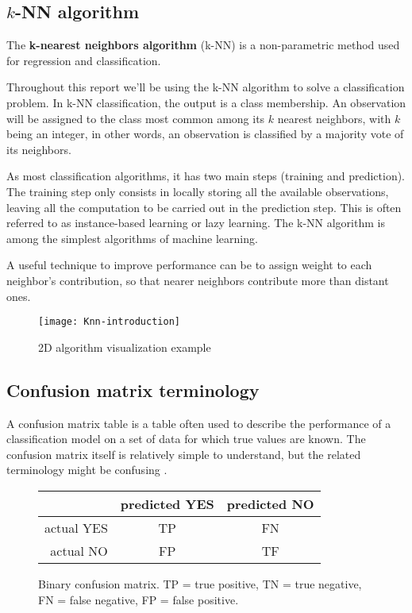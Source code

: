 \subsection{$k$-NN algorithm}

The \textbf{k-nearest neighbors algorithm} (k-NN) is a non-parametric method used for regression and classification. 

Throughout this report we'll be using the k-NN algorithm to solve a classification problem. In k-NN classification, the output is a class membership. An observation will be assigned to the class most common among its $k$ nearest neighbors, with $k$ being an integer, in other words, an observation is classified by a majority vote of its neighbors.

As most classification algorithms, it has two main steps (training and prediction). The training step only consists in locally storing all the available observations, leaving all the computation to be carried out in the prediction step. This is often referred to as instance-based learning or lazy learning. The k-NN algorithm is among the simplest algorithms of machine learning.

A useful technique to improve performance can be to assign weight to each neighbor's contribution, so that nearer neighbors contribute more than distant ones.
\begin{figure}[b]
	\centering
	\texttt{[image: Knn-introduction]}
	\caption{2D algorithm visualization example}
	\label{fig:knn-introduction}
\end{figure}

\subsection{Confusion matrix terminology}

A confusion matrix table is a table often used to describe the performance of a classification model on a set of data for which true values are known. The confusion matrix itself is relatively simple to understand, but the related terminology might be confusing \cite{confmat-terminology}.
\begin{figure} %
	\centering
	\setlength{\arrayrulewidth}{0.5mm}
	\renewcommand{\arraystretch}{1.3}
	\newcommand{\colorcell}{\cellcolor{lightgray}}
	\setlength\extrarowheight{0.5pt}
	\begin{tabular}{r|c|c|}
		           & predicted YES & predicted NO  \\ \hline
		actual YES & \colorcell TP & \colorcell FN \\ \hline
		actual NO  & \colorcell FP & \colorcell TF \\ \hline
	\end{tabular}
	\caption{Binary confusion matrix. TP = true positive, TN = true negative, FN = false negative, FP = false positive.}
	\label{fig:conf_mat}
\end{figure}

